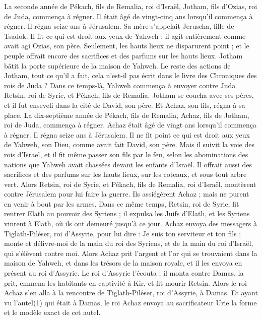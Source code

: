 \begin{multicols}{2}
La seconde année de Pékach, fils de Remalia, roi d’Israël, Jotham, fils d’Ozias, roi de Juda, commença à régner.
Il était âgé de vingt-cinq ans lorsqu’il commença à régner. Il régna seize ans à Jérusalem. Sa mère s’appelait Jeruscha, fille de Tsadok.
Il fit ce qui est droit aux yeux de Yahweh ; il agit entièrement comme avait agi Ozias, son père.
Seulement, les hauts lieux ne disparurent point ; et le peuple offrait encore des sacrifices et des parfums sur les hauts lieux. Jotham bâtit la porte supérieure de la maison de Yahweh.
Le reste des actions de Jotham, tout ce qu’il a fait, cela n’est-il pas écrit dans le livre des Chroniques des rois de Juda ?
Dans ce temps-là, Yahweh commença à envoyer contre Juda Retsin, roi de Syrie, et Pékach, fils de Remalia.
Jotham se coucha avec ses pères, et il fut enseveli dans la cité de David, son père. Et Achaz, son fils, régna à sa place.
\VerseOne{}La dix-septième année de Pékach, fils de Remalia, Achaz, fils de Jotham, roi de Juda, commença à régner.
Achaz était âgé de vingt ans lorsqu’il commença à régner. Il régna seize ans à Jérusalem. Il ne fit point ce qui est droit aux yeux de Yahweh, son Dieu, comme avait fait David, son père.
Mais il suivit la voie des rois d’Israël, et il fit même passer son fils par le feu, selon les abominations des nations que Yahweh avait chassées devant les enfants d’Israël.
Il offrait aussi des sacrifices et des parfums sur les hauts lieux, sur les coteaux, et sous tout arbre vert.
Alors Retsin, roi de Syrie, et Pékach, fils de Remalia, roi d’Israël, montèrent contre Jérusalem pour lui faire la guerre. Ils assiégèrent Achaz ; mais ne purent en venir à bout par les armes.
Dans ce même temps, Retsin, roi de Syrie, fit rentrer Elath au pouvoir des Syriens ; il expulsa les Juifs d’Elath, et les Syriens vinrent à Elath, où ils ont demeuré jusqu’à ce jour.
Achaz envoya des messagers à Tiglath-Piléser, roi d’Assyrie, pour lui dire : Je suis ton serviteur et ton fils ; monte et délivre-moi de la main du roi des Syriens, et de la main du roi d’Israël, qui s’élèvent contre moi.
Alors Achaz prit l’argent et l’or qui se trouvaient dans la maison de Yahweh, et dans les trésors de la maison royale, et il les envoya en présent au roi d’Assyrie.
Le roi d’Assyrie l’écouta ; il monta contre Damas, la prit, emmena les habitants en captivité à Kir, et fit mourir Retsin.
Alors le roi Achaz s’en alla à la rencontre de Tiglath-Piléser, roi d’Assyrie, à Damas. Et ayant vu l’autel(1) qui était à Damas, le roi Achaz envoya au sacrificateur Urie la forme et le modèle exact de cet autel.

\end{multicols}

